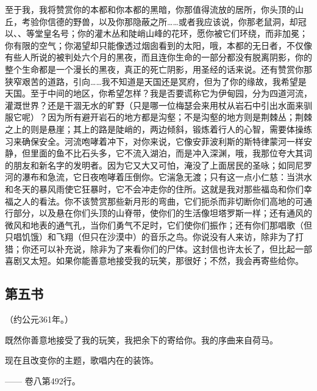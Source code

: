 至于我，我将赞赏你的本都和你本都的黑暗，你那值得流放的居所，你头顶的山丘，考验你信德的野兽，以及你那隐蔽之所……或者我应该说，你那老鼠洞，却冠以、、等堂皇名号；你的灌木丛和陡峭山峰的花环，愿你被它们环绕，而非加冕；你有限的空气；你渴望却只能像透过烟囱看到的太阳，哦，本都的无日者，不仅像有些人所说的被判处六个月的黑夜，而且连你生命的一部分都没有脱离阴影，你的整个生命都是一个漫长的黑夜，真正的死亡阴影，用圣经的话来说。还有赞赏你那狭窄艰苦的道路，引向……我不知道是天国还是冥府，但为了你的缘故，我希望是天国。至于中间的地区，你希望怎样？我是否要谎称它为伊甸园，分为四道河流，灌溉世界？还是干涸无水的旷野（只是哪一位梅瑟会来用杖从岩石中引出水面来驯服它呢）？因为所有避开岩石的地方都是沟壑；不是沟壑的地方则是荆棘丛；荆棘之上的则是悬崖；其上的路是陡峭的，两边倾斜，锻炼着行人的心智，需要体操练习来确保安全。河流咆哮着冲下，对你来说，它像安菲波利斯的斯特律蒙河一样安静，但里面的鱼不比石头多，它不流入湖泊，而是冲入深渊，哦，我那位夸大其词的朋友和新名字的发明者。因为它又大又可怕，淹没了上面居民的圣咏；如同尼罗河的瀑布和急流，它日夜咆哮着压倒你。它湍急无渡；只有这一点小仁慈：当洪水和冬天的暴风雨使它狂暴时，它不会冲走你的住所。这就是我对那些福岛和你们幸福之人的看法。你不该赞赏那些新月形的弯曲，它们扼杀而非切断你们高地的可通行部分，以及悬在你们头顶的山脊带，使你们的生活像坦塔罗斯一样；还有通风的微风和地表的通气孔，当你们勇气不足时，它们使你们振作；还有你们那唱歌（但只唱饥饿）和飞翔（但只在沙漠中）的音乐之鸟。你说没有人来访，除非为了打猎；你还可以补充说，除非为了来看你们的尸体。这封信也许太长了，但比起一部喜剧又太短。如果你能善意地接受我的玩笑，那很好；不然，我会再寄些给你。\par


\subsection{第五书}

（约公元361年。）\par

既然你善意地接受了我的玩笑，我把余下的寄给你。我的序曲来自荷马。\par

现在且改变你的主题，\newline{}歌唱内在的装饰。\par

—— 卷八第492行。\par

